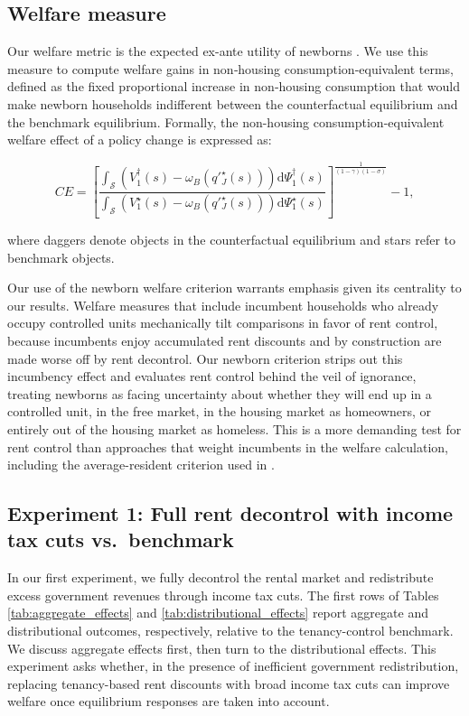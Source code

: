 \documentclass[parskip=full]{article}
\begin{document}
\subsection{Welfare measure}\label{sec:welfare_measure} Our welfare metric is the expected ex-ante utility of newborns \citep{rawls-1971,conesa-et-al,gkkoc}. We use this measure to compute welfare gains in non‑housing consumption‑equivalent terms, defined as the fixed proportional increase in non‑housing consumption that would make newborn households indifferent between the counterfactual equilibrium and the benchmark equilibrium. Formally, the non-housing consumption-equivalent welfare effect of a policy change is expressed as:

\begin{equation}
  CE = \left[\frac{\int_{\mathcal{S}}\left(V^{\dagger}_{1}(s)-\omega_{B}\left(q'^{\star}_{J}(s)\right)\right)\mathrm{d}\Psi^{\dagger}_{1}(s)}{\int_{\mathcal{S}}\left(V^{\star}_{1}(s)-\omega_{B}\left(q'^{\star}_{J}(s)\right)\right)\mathrm{d}\Psi^{\star}_{1}(s)}\right]^{\frac{1}{(1-\gamma)(1-\sigma)}}-1,
\end{equation}

\noindent where daggers denote objects in the counterfactual equilibrium and stars refer to benchmark objects. 

Our use of the newborn welfare criterion warrants emphasis given its centrality to our results. Welfare measures that include incumbent households who already occupy controlled units mechanically tilt comparisons in favor of rent control, because incumbents enjoy accumulated rent discounts and by construction are made worse off by rent decontrol. Our newborn criterion strips out this incumbency effect and evaluates rent control behind the veil of ignorance, treating newborns as facing uncertainty about whether they will end up in a controlled unit, in the free market, in the housing market as homeowners, or entirely out of the housing market as homeless. This is a more demanding test for rent control than approaches that weight incumbents in the welfare calculation, including the average-resident criterion used in \citet{fmn-2023}.

\subsection{Experiment 1: Full rent decontrol with income tax cuts vs.\ benchmark}\label{sec:exp_1}

In our first experiment, we fully decontrol the rental market and redistribute excess government revenues through income tax cuts. The first rows of Tables \ref{tab:aggregate_effects} and \ref{tab:distributional_effects} report aggregate and distributional outcomes, respectively, relative to the tenancy-control benchmark. We discuss aggregate effects first, then turn to the distributional effects. This experiment asks whether, in the presence of inefficient government redistribution, replacing tenancy-based rent discounts with broad income tax cuts can improve welfare once equilibrium responses are taken into account.
\end{document}
